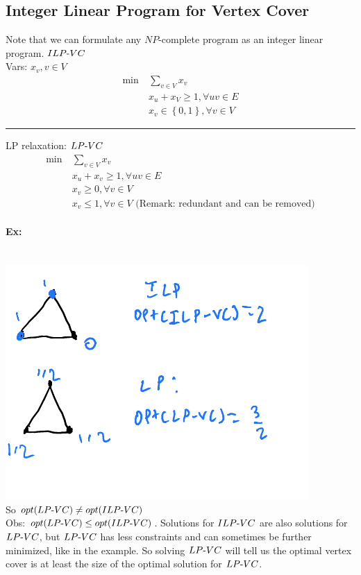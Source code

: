 \documentclass[12 pt]{article}
\begin{document}
          \subsection{Integer Linear Program for Vertex Cover}
          Note that we can formulate any $NP$-complete program as an
          integer linear program. 
          $ILP\hbox{-}VC$
          \\ Vars: $x_v, v \in V$
          \begin{align*}
            \min \ &\sum_{v\in V} x_v
            \\ & x_u + x_V \geq 1, \forall uv \in E
            \\ & x_v \in \left\{0,1\right\}, \forall v \in V
          \end{align*}
          \noindent \rule{\textwidth}{0.5pt}
          LP relaxation: $LP\hbox{-}VC$
          \begin{align*}
            \min \ & \sum_{v\in V}x_v
            \\ & x_u+x_v \geq 1, \forall uv \in E
            \\ & x_v \geq 0, \forall v \in V
            \\ & x_v \leq 1, \forall v \in V \text{ (Remark: redundant
                 and can be removed)}
          \end{align*}
          \paragraph{Ex:}~
          \\ \includegraphics[width=.9\textwidth]{i148.pdf}
          \\ So $opt(LP\hbox{-}VC)\neq opt(ILP\hbox{-}VC)$
          \\ Obs: $opt(LP\hbox{-}VC)\leq
          opt(ILP\hbox{-}VC)$. Solutions for $ILP\hbox{-}VC$ are also
          solutions for $LP\hbox{-}VC$, but $LP\hbox{-}VC$ has less
          constraints and can sometimes be further minimized, like in
          the example. So solving $LP\hbox{-}VC$ will tell us the
          optimal vertex cover is at least the size of the optimal
          solution for $LP\hbox{-}VC$.
\end{document}

